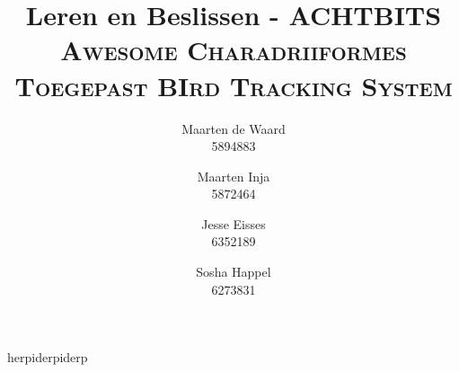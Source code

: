 \documentclass[a4paper,10pt]{article}
\title{Leren en Beslissen - ACHTBITS\\\large \textsc{Awesome Charadriiformes Toegepast
BIrd Tracking System}}
\author{Maarten de Waard\\5894883 \and Maarten Inja \\5872464 \and Jesse Eisses \\
6352189 \and Sosha Happel\\ 6273831}
\begin{document}
\maketitle
herpiderpiderp
\end{document}
